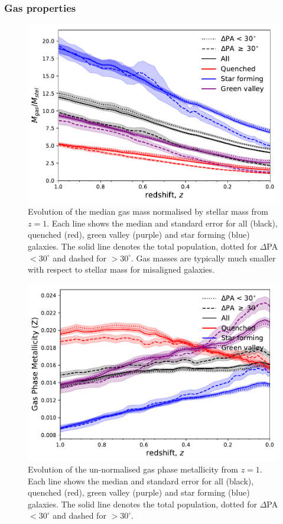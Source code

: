 \documentclass[fleqn,usenatbib]{mnras}
\begin{document}
\subsubsection{Gas properties}

\begin{figure}
	\includegraphics[width=\linewidth]{tng_results/gas_mass_timestep_norm.pdf}
    \caption{Evolution of the median gas mass normalised by stellar mass from $z=1$. Each line shows the median and standard error for all (black), quenched (red), green valley (purple) and star forming (blue) galaxies. The solid line denotes the total population, dotted for $\Delta$PA $< 30^{\circ}$ and dashed for $> 30^{\circ}$. Gas masses are typically much smaller with respect to stellar mass for misaligned galaxies.}
    \label{fig:gas_mass}
\end{figure}

\begin{figure}
	\includegraphics[width=\linewidth]{tng_results/gas_metallicity_nonorm.pdf}
    \caption{Evolution of the un-normalised gas phase metallicity from $z=1$. Each line shows the median and standard error for all (black), quenched (red), green valley (purple) and star forming (blue) galaxies. The solid line denotes the total population, dotted for $\Delta$PA $< 30^{\circ}$ and dashed for $> 30^{\circ}$.}
    \label{fig:gas_metallicity}
\end{figure}
\end{document}
